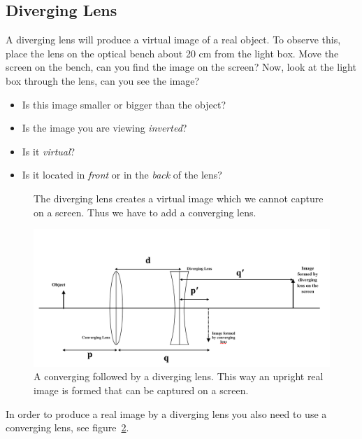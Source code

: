 \documentclass[11pt, a4paper]{article}
\begin{document}
\subsection{Diverging Lens}
A diverging lens will produce a virtual image of a real object. 
To observe this, place the lens on the optical bench about 20 cm from the light
box.
Move the screen on the bench, can you find the image on the screen?
Now, look at the light box through the lens, can you see the image?
\begin{itemize}
    \item Is this image smaller or bigger than the object?
    \item Is the image you are viewing \textit{inverted}?
    \item Is it \textit{virtual}?
    \item Is it located in \textit{front} or in the \textit{back} of the lens?
\end{itemize}
\fillwithlines{3cm}

\begin{figure}[tbh]
    \centering
    \def\svgwidth{0.7\textwidth}
    
    \caption{The diverging lens creates a virtual image which we cannot capture on a screen.
    Thus we have to add a converging lens.}
    \label{fig:divLens}
\end{figure}

\begin{figure}[tbh]
    \centering
    \includegraphics[width=\textwidth]{figures/ConvergingDivergingLens.png}
    \caption{A converging followed by a diverging lens.
    This way an upright real image is formed that can be captured on a screen.}
    \label{fig:divergingConvergingLens}
\end{figure}
In order to produce a real image by a diverging lens you also need to use a converging lens,
see figure~\ref{fig:divergingConvergingLens}.
\end{document}
